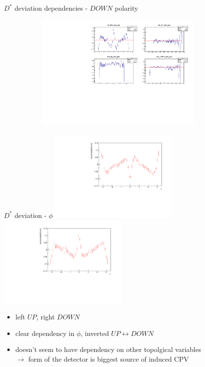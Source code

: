 \documentclass[11pt]{beamer}
\begin{document}
\begin{frame}{$D^*$ deviation dependencies - $DOWN$ polarity}
\begin{figure}
\begin{subfigure}{1.20\textwidth}
\includegraphics[width=0.9\textwidth]{histoDOWN2/asymmetriesDST.pdf}
\end{subfigure}
\end{figure}
\end{frame}
\begin{frame}{$D^*$ deviation - $\phi$}
\centering
\includegraphics[width=0.48\textwidth]{up_pdf/deviation/h_phi_reco_Dst_pos.pdf}
\includegraphics[width=0.48\textwidth]{down_pdf/deviation/h_phi_reco_Dst_pos.pdf}
\begin{itemize}
\item left $UP$, right $DOWN$
\item clear dependency in $\phi$, inverted $UP\leftrightarrow DOWN$
\item doesn't seem to have dependency on other topolgical variables\\
$\rightarrow$ form of the detector is biggest source of induced CPV 
\end{itemize}
\end{frame}
\end{document}
